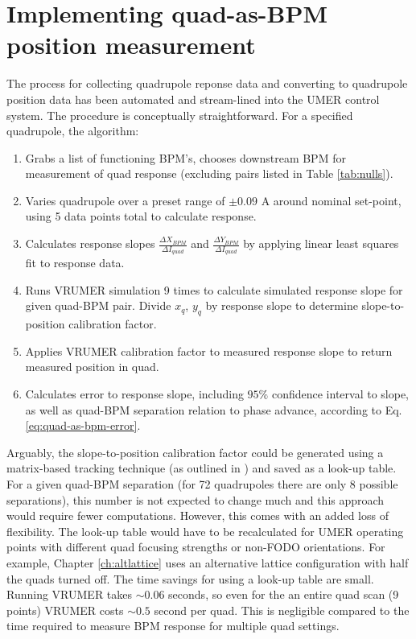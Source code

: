 \appendix
\renewcommand{\thechapter}{A}
\renewcommand{\chaptername}{Appendix}

\chapter{Implementing quad-as-BPM position measurement}



The process for collecting quadrupole reponse data and converting to quadrupole position data has been automated and stream-lined into the UMER control system. The procedure is conceptually straightforward. For a specified quadrupole, the algorithm:

\begin{enumerate}
\item Grabs a list of functioning BPM's, chooses downstream BPM for measurement of quad response (excluding pairs listed in Table \ref{tab:nulls}).
\item Varies quadrupole over a preset range of $\pm 0.09$ A around nominal set-point, using 5 data points total to calculate response.
\item Calculates response slopes $\frac{\Delta X_{BPM}}{\Delta I_{quad}}$ and $\frac{\Delta Y_{BPM}}{\Delta I_{quad}}$ by applying linear least squares fit to response data.
\item Runs VRUMER simulation 9 times to calculate simulated response slope for given quad-BPM pair. Divide $x_q$, $y_q$ by response slope to determine slope-to-position calibration factor. 
\item Applies VRUMER calibration factor to measured response slope to return measured position in quad. 
\item Calculates error to response slope, including $95\%$ confidence interval to slope, as well as quad-BPM separation relation to phase advance, according to Eq. \ref{eq:quad-as-bpm-error}. 
\end{enumerate}

Arguably, the slope-to-position calibration factor could be generated using a matrix-based tracking technique (as outlined in \cite{KPRnote}) and saved as a look-up table. For a given quad-BPM separation (for 72 quadrupoles there are only 8 possible separations), this number is not expected to change much and this approach would require fewer computations. However, this comes with an added loss of flexibility. The look-up table would have to be recalculated for UMER operating points with different quad focusing strengths or non-FODO orientations. For example, Chapter \ref{ch:altlattice} uses an alternative lattice configuration with half the quads turned off. 
The time savings for using a look-up table are small. Running VRUMER takes $\sim 0.06$ 
seconds, so even for the an entire quad scan (9 points) VRUMER costs $\sim 0.5$ second per quad. This is negligible compared to the time required to measure BPM response for multiple quad settings.

